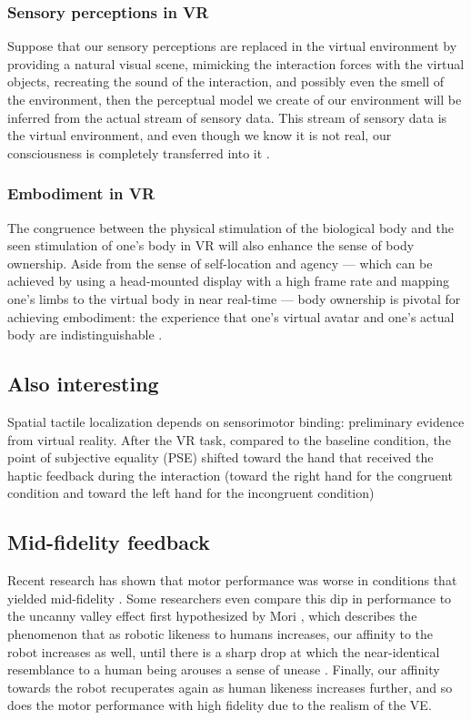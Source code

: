 \documentclass[conference]{IEEEtran}
\begin{document}
\subsubsection{Sensory perceptions in VR}
Suppose that our sensory perceptions are replaced in the virtual environment by providing a natural visual scene, mimicking the interaction forces with the virtual objects, recreating the sound of the interaction, and possibly even the smell of the environment, then the perceptual model we create of our environment will be inferred from the actual stream of sensory data. This stream of sensory data is the virtual environment, and even though we know it is not real, our consciousness is completely transferred into it \cite{Slater2016EnhancingReality}. 

\subsubsection{Embodiment in VR}
The congruence between the physical stimulation of the biological body and the seen stimulation of one's body in VR will also enhance the sense of body ownership. Aside from the sense of self-location and agency --- which can be achieved by using a head-mounted display with a high frame rate and mapping one's limbs to the virtual body in near real-time --- body ownership is pivotal for achieving embodiment:  the experience that one's virtual avatar and one's actual body are indistinguishable \cite{Kilteni2012TheReality}.

\subsection{Also interesting}
Spatial tactile localization depends on sensorimotor binding: preliminary evidence from virtual reality. After the VR task, compared to the baseline condition, the point of subjective equality (PSE) shifted toward the hand that received the haptic feedback during the interaction (toward the right hand for the congruent condition and toward the left hand for the incongruent condition)\cite{Girondini2024SpatialReality}


\subsection{Mid-fidelity feedback}
Recent research has shown that motor performance was worse in conditions that yielded mid-fidelity \cite{MahdiNabiyouni201520153DUI.}.
Some researchers even compare this dip in performance to the uncanny valley effect first hypothesized by Mori \cite{Mori2012TheValley}, which describes the phenomenon that as robotic likeness to humans increases, our affinity to the robot increases as well, until there is a sharp drop at which the near-identical resemblance to a human being arouses a sense of unease \cite{Bhargava2018EvaluatingSimulations}. Finally, our affinity towards the robot recuperates again as human likeness increases further, and so does the motor performance with high fidelity due to the realism of the VE. 
\end{document}
